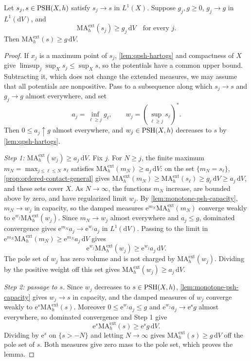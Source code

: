 \begin{lemma}\label{lem:density-subsolution-lone-closure}
Let $s_j,s\in\mathrm{PSH}(X,h)$ satisfy $s_j\to s$ in $L^1(X)$. Suppose $g_j,g\geq0$, $g_j\to g$ in $L^1(\mathrm{d}V)$, and
\[
 \mathrm{MA}^{\mathrm{ext}}_h(s_j)\geq g_j\,\mathrm{d}V
 \quad\text{for every }j.
\]
Then $\mathrm{MA}^{\mathrm{ext}}_h(s)\geq g\,\mathrm{d}V$.
\end{lemma}
\begin{proof}
If $x_j$ is a maximum point of $s_j$, \cref{lem:qpsh-hartogs} and compactness of $X$ give $\limsup_j\sup_Xs_j\leq\sup_Xs$, so the potentials have a common upper bound. Subtracting it, which does not change the extended measures, we may assume that all potentials are nonpositive. Pass to a subsequence along which $s_j\to s$ and $g_j\to g$ almost everywhere, and set
\[
 a_j=\inf_{\ell\geq j}g_\ell,\qquad
 w_j=\left(\sup_{\ell\geq j}s_\ell\right)^*.
\]
Then $0\leq a_j\uparrow g$ almost everywhere, and $w_j\in\mathrm{PSH}(X,h)$ decreases to $s$ by \cref{lem:qpsh-hartogs}.

\emph{Step 1: $\mathrm{MA}^{\mathrm{ext}}_h(w_j)\geq a_j\,\mathrm{d}V$.} Fix $j$. For $N\geq j$, the finite maximum $m_N=\max_{j\leq\ell\leq N}s_\ell$ satisfies $\mathrm{MA}^{\mathrm{ext}}_h(m_N)\geq a_j\,\mathrm{d}V$: on the set $\{m_N=s_\ell\}$, \cref{prop:ordered-contact-general} gives $\mathrm{MA}^{\mathrm{ext}}_h(m_N)\geq\mathrm{MA}^{\mathrm{ext}}_h(s_\ell)\geq g_\ell\,\mathrm{d}V\geq a_j\,\mathrm{d}V$, and these sets cover $X$. As $N\to\infty$, the functions $m_N$ increase, are bounded above by zero, and have regularized limit $w_j$. By \cref{lem:monotone-psh-capacity}, $m_N\to w_j$ in capacity, so the damped measures $\mathrm{e}^{m_N}\mathrm{MA}^{\mathrm{ext}}_h(m_N)$ converge weakly to $\mathrm{e}^{w_j}\mathrm{MA}^{\mathrm{ext}}_h(w_j)$. Since $m_N\to w_j$ almost everywhere and $a_j\leq g$, dominated convergence gives $\mathrm{e}^{m_N}a_j\to\mathrm{e}^{w_j}a_j$ in $L^1(\mathrm{d}V)$. Passing to the limit in $\mathrm{e}^{m_N}\mathrm{MA}^{\mathrm{ext}}_h(m_N)\geq\mathrm{e}^{m_N}a_j\,\mathrm{d}V$ gives
\[
 \mathrm{e}^{w_j}\mathrm{MA}^{\mathrm{ext}}_h(w_j)
       \geq \mathrm{e}^{w_j}a_j\,\mathrm{d}V.
\]
The pole set of $w_j$ has zero volume and is not charged by $\mathrm{MA}^{\mathrm{ext}}_h(w_j)$. Dividing by the positive weight off this set gives $\mathrm{MA}^{\mathrm{ext}}_h(w_j)\geq a_j\,\mathrm{d}V$.

\emph{Step 2: passage to $s$.} Since $w_j$ decreases to $s\in\mathrm{PSH}(X,h)$, \cref{lem:monotone-psh-capacity} gives $w_j\to s$ in capacity, and the damped measures of $w_j$ converge weakly to $\mathrm{e}^s\mathrm{MA}^{\mathrm{ext}}_h(s)$. Moreover $0\leq\mathrm{e}^{w_j}a_j\leq g$ and $\mathrm{e}^{w_j}a_j\to\mathrm{e}^sg$ almost everywhere, so dominated convergence and Step 1 give
\[
 \mathrm{e}^s\mathrm{MA}^{\mathrm{ext}}_h(s)
       \geq\mathrm{e}^s g\,\mathrm{d}V.
\]
Dividing by $\mathrm{e}^s$ on $\{s>-N\}$ and letting $N\to\infty$ gives $\mathrm{MA}^{\mathrm{ext}}_h(s)\geq g\,\mathrm{d}V$ off the pole set of $s$. Both measures give zero mass to the pole set, which proves the lemma.
\end{proof}

